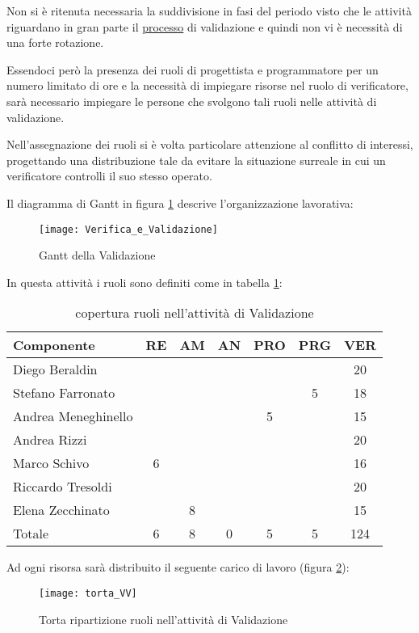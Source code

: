 Non si è ritenuta necessaria la suddivisione in fasi del periodo visto che le attività riguardano in gran parte il \underline{processo} di validazione e quindi non vi è necessità di una forte rotazione.

Essendoci però la presenza dei ruoli di progettista e programmatore per un numero limitato di ore e la necessità di impiegare risorse nel ruolo di verificatore, sarà necessario impiegare le persone che svolgono tali ruoli nelle attività di validazione.  

Nell'assegnazione dei ruoli si è volta particolare attenzione al conflitto di interessi,  progettando una distribuzione tale da evitare la situazione surreale in cui un verificatore controlli il suo stesso operato.

Il diagramma di Gantt in figura \ref{fig:gantvv} descrive l'organizzazione lavorativa:

\begin{figure}[h!]
  \texttt{[image: Verifica\_e\_Validazione]}
\caption{Gantt della Validazione}\label{fig:gantvv}
\end{figure}

In questa attività i ruoli sono definiti come in tabella \ref{tab:ruolivv}:

\begin{table}[h!]
\centering
\begin{tabular}{|l|c|c|c|c|c|c|}
\hline
Componente& RE& AM& AN& PRO& PRG& VER\\
\hline
Diego Beraldin & & & & & & 20\\
Stefano Farronato & & & & & 5& 18\\
Andrea Meneghinello & & & & 5& & 15\\
Andrea Rizzi & & & & & & 20\\
Marco Schivo & 6& & & & & 16\\
Riccardo Tresoldi & & & & & & 20\\
Elena Zecchinato & & 8& & & & 15\\
\hline
Totale & 6& 8& 0& 5& 5& 124\\
\hline
\end{tabular}
\caption{copertura ruoli nell'attività di Validazione}\label{tab:ruolivv}
\end{table}
\clearpage

Ad ogni risorsa sarà distribuito il seguente carico di lavoro (figura \ref{fig:ruolivv}):

\begin{figure}[h!]
\centering
  \texttt{[image: torta\_VV]}
\caption{Torta ripartizione ruoli nell'attività di Validazione}\label{fig:ruolivv}
\end{figure}

